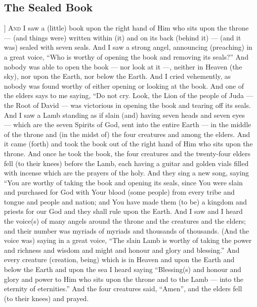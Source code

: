 \begin{pages}
\begin{Leftside}
        			\chapter{The Sealed Book}
				]
		\renewcommand{\LettrineFontHook}{\Zallmanfamily}
		\lettrine[lines=3]{A}{nd} I saw a (little) book upon the right hand of Him who sits upon the throne — (and things were) written within (it) and on its back (behind it) — (and it was) sealed with seven seals. And I saw a strong angel, announcing (preaching) in a great voice, “Who is worthy of opening the book and removing its seals?” And nobody was able to open the book — nor look at it —, neither in Heaven (the sky), nor upon the Earth, nor below the Earth. And I cried vehemently, as nobody was found worthy of either opening or looking at the book.
		\pend
		\pstart
		And one of the elders says to me saying, “Do not cry. Look, the Lion of the people of Juda — the Root of David — was victorious in opening the book and tearing off its seals. And I saw a Lamb standing as if slain (and) having seven heads and seven eyes — which are the seven Spirits of God, sent into the entire Earth — in the middle of the throne and (in the midst of) the four creatures and among the elders. And it came (forth) and took the book out of the right hand of Him who sits upon the throne.
		\pend
		\pstart
		And once he took the book, the four creatures and the twenty-four elders fell (to their knees) before the Lamb, each having a guitar and golden vials filled with incense which are the prayers of the holy. And they sing a new song, saying “You are worthy of taking the book and opening its seals, since You were slain and purchased for God with Your blood (some people) from every tribe and tongue and people and nation; and You have made them (to be) a kingdom and priests for our God and they shall rule upon the Earth. 
		\pend
		\pstart
		And I saw and I heard the voice(s) of many angels around the throne and the creatures and the elders; and their number was myriads of myriads and thousands of thousands. (And the voice was) saying in a great voice, “The slain Lamb is worthy of taking the power and richness and wisdom and might and honour and glory and blessing.” And every creature (creation, being) which is in Heaven and upon the Earth and below the Earth and upon the sea I heard saying “Blessing(s) and honour and glory and power to Him who sits upon the throne and to the Lamb — into the eternity of eternities.” And the four creatures said, “Amen”, and the elders fell (to their knees) and prayed.
		\pend
        \endnumbering
    \end{Leftside}

\end{pages} 
\Pages


